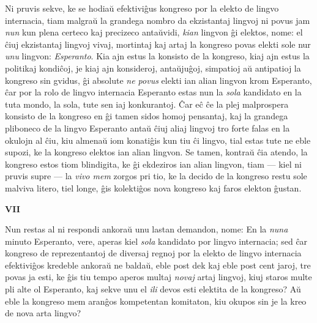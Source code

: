    Ni pruvis sekve, ke se hodia\u u efektivi\^gus kongreso por la elekto
de lingvo internacia, tiam malgra\u u la grandega nombro da
ekzistantaj lingvoj ni povus jam {\sl nun} kun plena certeco kaj
precizeco anta\u uvidi, {\sl kian} lingvon \^gi elektos, nome: el
\^ciuj ekzistantaj lingvoj vivaj, mortintaj kaj artaj la kongreso
povas elekti sole nur {\sl unu} lingvon: {\sl Esperanto}. Kia ajn
estus la konsisto de la kongreso, kiaj ajn estus la politikaj
kondi\^coj, je kiaj ajn konsideroj, anta\u uju\^goj, simpatioj a\u u
antipatioj la kongreso sin gvidus, \^gi absolute {\sl ne povus}
elekti ian alian lingvon krom Esperanto, \^car por la rolo de lingvo
internacia Esperanto estas nun la {\sl sola} kandidato en la tuta
mondo, la sola, tute sen iaj konkurantoj. \^Car e\^c \^ce la plej
malprospera konsisto de la kongreso en \^gi tamen sidos homoj
pensantaj, kaj la grandega pliboneco de la lingvo Esperanto anta\u u
\^ciuj aliaj lingvoj tro forte falas en la okulojn al \^ciu, kiu
almena\u u iom konati\^gis kun tiu \^ci lingvo, tial estas tute ne
eble supozi, ke la kongreso elektos ian alian lingvon. Se tamen,
kontra\u u \^cia atendo, la kongreso estos tiom blindigita, ke \^gi
ekdeziros ian alian lingvon, tiam --- kiel ni pruvis supre --- la
{\sl vivo mem} zorgos pri tio, ke la decido de la kongreso restu
sole malviva litero, tiel longe, \^gis kolekti\^gos nova kongreso
kaj faros elekton \^gustan.

\begin{center}
\textbf{VII}
\end{center}

   Nun restas al ni respondi ankora\u u unu lastan demandon, nome: En la
{\sl nuna} minuto Esperanto, vere, aperas kiel {\sl sola} kandidato
por lingvo internacia; sed \^car kongreso de reprezentantoj de
diversaj regnoj por la elekto de lingvo internacia efektivi\^gos
kredeble ankora\u u ne balda\u u, eble post dek kaj eble post cent
jaroj, tre povas ja esti, ke \^gis tiu tempo aperos multaj {\sl
novaj} artaj lingvoj, kiuj staros multe pli alte ol Esperanto, kaj
sekve unu el {\sl ili} devos esti elektita de la kongreso? A\u u
eble la kongreso mem aran\^gos kompetentan komitaton, kiu okupos sin
je la kreo de nova arta lingvo?

